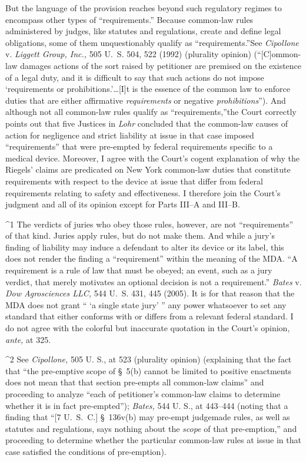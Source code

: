   But the language of the provision reaches beyond such regulatory
regimes to encompass other types of ``requirements.'' Because
common-law rules administered by judges, like statutes and regulations,
create and define legal obligations, some of them unquestionably qualify
as ``requirements.''\footnotemark[1] See \emph{Cipollone} v. \emph{Liggett Group,
Inc.,} 505 U.~S. 504, 522 (1992) (plurality opinion) (``[C]ommon-law
damages actions of the sort raised by petitioner are premised on the
existence of a legal duty, and it is difficult to say that such actions
do not impose ‘requirements or prohibitions.'\dots [I]t is the
essence of the common law to enforce duties that are either affirmative
\emph{requirements} or negative \emph{prohibitions}''). And although not
all common-law rules qualify as ``requirements,''\footnotemark[2] the Court
correctly points out that five Justices in \emph{Lohr} concluded that the
common-law causes of action for negligence and strict liability at
issue in that case imposed ``requirements'' that were pre-empted by
federal require\newpage  ments specific to a medical device. Moreover,
I agree with the Court's cogent explanation of why the Riegels'
claims are predicated on New York common-law duties that constitute
requirements with respect to the device at issue that differ from
federal requirements relating to safety and effectiveness. I therefore
join the Court's judgment and all of its opinion except for Parts
III--A and III--B.

^1 The verdicts of juries who obey those rules, however, are not
``requirements'' of that kind. Juries apply rules, but do not make
them. And while a jury's finding of liability may induce a defendant
to alter its device or its label, this does not render the finding a
``requirement'' within the meaning of the MDA. ``A requirement is
a rule of law that must be obeyed; an event, such as a jury verdict,
that merely motivates an optional decision is not a requirement.''
\emph{Bates} v. \emph{Dow Agrosciences LLC,} 544 U.~S. 431, 445 (2005).
It is for that reason that the MDA does not grant `` ‘a single
state jury' '' any power whatsoever to set any standard that either
conforms with or differs from a relevant federal standard. I do not
agree with the colorful but inaccurate quotation in the Court's
opinion, \emph{ante,} at 325.

^2 See \emph{Cipollone,} 505 U. S., at 523 (plurality opinion)
(explaining that the fact that ``the pre-emptive scope of \S~5(b)
cannot be limited to positive enactments does not mean that that section
pre-empts all common-law claims'' and proceeding to analyze ``each
of petitioner's common-law claims to determine whether it is in fact
pre-empted''); \emph{Bates,} 544 U. S., at 443--444 (noting that a
finding that ``[7 U.~S.~C.] \S~136v(b) may pre-empt judgemade rules,
as well as statutes and regulations, says nothing about the \emph{scope} of
that pre-emption,'' and proceeding to determine whether the particular
common-law rules at issue in that case satisfied the conditions of
pre-emption).
